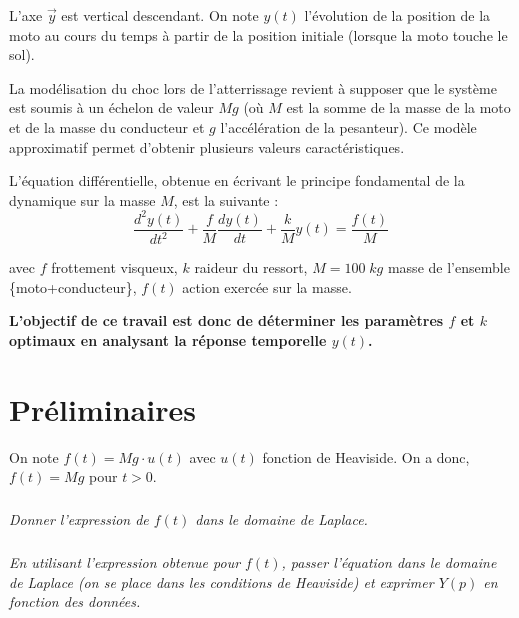 \documentclass[11pt,oneside]{article}
\begin{document}
{L'axe $\overrightarrow{y}$ est vertical descendant. On note $y(t)$ l'évolution de la position de la moto au cours du temps à
partir de la position initiale (lorsque la moto touche le sol).

La modélisation du choc lors de l'atterrissage revient à supposer que le système est soumis à un échelon de valeur $Mg$ (où $M$ est la somme de la masse de la moto et de la masse du conducteur et $g$ l'accélération de la pesanteur). Ce modèle
approximatif permet d'obtenir plusieurs valeurs caractéristiques.
}

L'équation différentielle, obtenue en écrivant le principe fondamental de la dynamique sur la masse $M$, est la suivante :
$$
\dfrac{d^2y(t)}{dt^2} + \dfrac{f}{M} \dfrac{dy(t)}{dt} + \dfrac{k}{M}y(t) = \dfrac{f(t)}{M}
$$

avec $f$ frottement visqueux, $k$ raideur du ressort, $M=100\;kg$ masse de l'ensemble \{moto+conducteur\}, $f(t)$
action exercée sur la masse.

\textbf{L'objectif de ce travail est donc de déterminer les paramètres $f$ et $k$ optimaux en analysant la réponse
temporelle $y(t)$.}


\section{Préliminaires}




On note $f(t)=Mg\cdot u(t)$ avec $u(t)$ fonction de Heaviside. On a donc, $f(t)=Mg$ pour $t>0$. 

\subparagraph{}
\textit{Donner l'expression de $f(t)$ dans le domaine de Laplace.}



\subparagraph{}
\textit{En utilisant l'expression obtenue pour $f(t)$, passer l'équation dans le domaine de Laplace
(on se place dans les conditions de Heaviside) et exprimer $Y(p)$ en fonction des données.}
\end{document}
